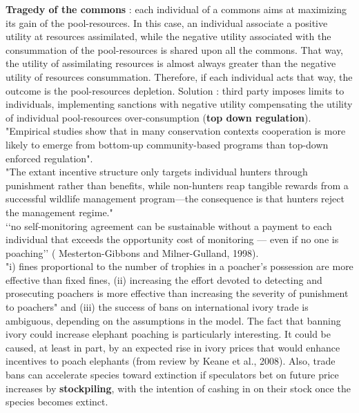 \documentclass[12pt]{article}
\begin{document}
\textbf{Tragedy of the commons} : each individual of a commons aims at maximizing its gain of the pool-resources. In this case, an individual associate a positive utility at resources assimilated, while the negative utility associated with the consummation of the pool-resources is shared upon all the commons. That way, the utility of assimilating resources is almost always greater than the negative utility of resources consummation. Therefore, if each individual acts that way, the outcome is the pool-resources depletion. Solution : third party imposes limits to individuals, implementing sanctions with negative utility compensating the utility of individual pool-resources over-consumption (\textbf{top down regulation}).\\
"Empirical studies show that in many conservation contexts
cooperation is more likely to emerge from bottom-up community-based programs than top-down enforced regulation".\\
"The extant incentive structure only targets individual hunters
through punishment rather than benefits, while non-hunters reap
tangible rewards from a successful wildlife management program—the consequence is that hunters reject the management regime."\\
‘‘no self-monitoring agreement can be sustainable without a payment to each individual that exceeds the opportunity cost of monitoring — even if no one is poaching’’ (
Mesterton-Gibbons and
Milner-Gulland, 1998).\\
"i) fines proportional to the number of trophies in a poacher’s
possession are more effective than fixed fines, (ii) increasing the effort devoted to detecting and prosecuting poachers is more effective than increasing the severity of punishment to poachers" and (iii) the success of bans on international ivory trade is ambiguous, depending on the assumptions in
the model. The fact that banning ivory could increase elephant
poaching is particularly interesting. It could be caused, at least in
part, by an expected rise in ivory prices that would enhance incentives to poach elephants (from review by Keane et al., 2008). Also, trade bans can accelerate species toward
extinction if speculators bet on future price increases by \textbf{stockpiling}, with the intention of cashing in on their stock once the species
becomes extinct.\\
\end{document}

